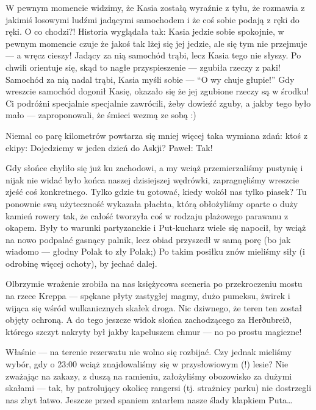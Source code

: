 
W pewnym momencie widzimy, że Kasia zostałą wyraźnie z tyłu, że rozmawia z jakimiś losowymi ludźmi jadącymi samochodem i że coś sobie podają z ręki do ręki. O co chodzi?! Historia wyglądała tak: Kasia jedzie sobie spokojnie, w pewnym momencie czuje że jakoś tak lżej się jej jedzie, ale się tym nie przejmuje --- a wręcz cieszy! Jadący za nią samochód trąbi, lecz Kasia tego nie słyszy. Po chwili orientuje się, skąd to nagłe przyspieszenie --- zgubiła rzeczy z paki! Samochód za nią nadal trąbi, Kasia myśli sobie --- “O wy chuje głupie!” Gdy wreszcie samochód dogonił Kasię, okazało się że jej zgubione rzeczy są w środku! Ci podróżni specjalnie specjalnie zawrócili, żeby dowieźć zguby, a jakby tego było mało --- zaproponowali, że śmieci wezmą ze sobą :)

Niemal co parę kilometrów powtarza się mniej więcej taka wymiana zdań:
ktoś z ekipy: Dojedziemy w jeden dzień do Askji?
Paweł: Tak!


Gdy słońce chyliło się już ku zachodowi, a my wciąż przemierzaliśmy pustynię i nijak nie widać było końca naszej dzisiejszej wędrówki, zapragnęliśmy wreszcie zjeść coś konkretnego. Tylko gdzie tu gotować, kiedy wokół nas tylko piasek? Tu ponownie swą użyteczność wykazała płachta, którą obłożyliśmy oparte o duży kamień rowery tak, że całość tworzyła coś w rodzaju plażowego parawanu z okapem. Były to warunki partyzanckie i Put-kucharz wiele się napocił, by wciąż na nowo podpalać gasnący palnik, lecz obiad przyszedł w samą porę (bo jak wiadomo --- głodny Polak to zły Polak;) Po takim posiłku znów mieliśmy siły (i odrobinę więcej ochoty), by jechać dalej.

Olbrzymie wrażenie zrobiła na nas księżycowa sceneria po przekroczeniu mostu na rzece Kreppa --- spękane płyty zastygłej magmy, dużo pumeksu, żwirek i wijąca się wśród wulkanicznych skałek droga. Nic dziwnego, że teren ten został objęty ochroną. A do tego jeszcze widok słońca zachodzącego za Herðubreið, którego szczyt nakryty był jakby kapeluszem chmur --- no po prostu magiczne!

Właśnie --- na terenie rezerwatu nie wolno się rozbijać. Czy jednak mieliśmy wybór, gdy o 23:00 wciąż znajdowaliśmy się w przysłowiowym (!) lesie? Nie zważając na zakazy, z duszą na ramieniu, założyliśmy obozowisko za dużymi skałami --- tak, by patrolujący okolicę rangersi (tj. strażnicy parku) nie dostrzegli nas zbyt łatwo. Jeszcze przed spaniem zatarłem nasze ślady klapkiem Puta…

